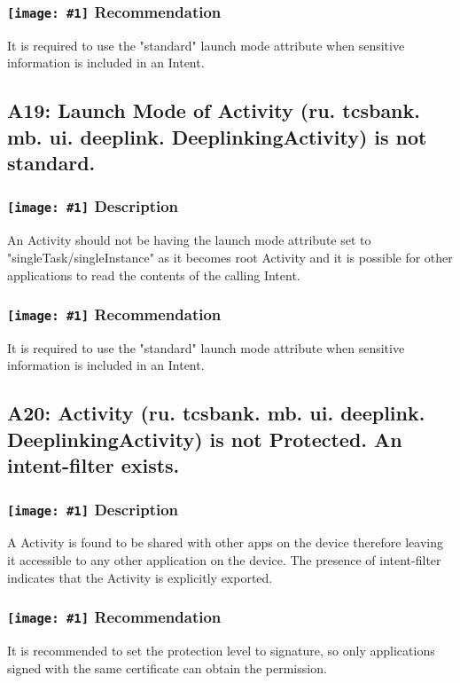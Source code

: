 \documentclass[12p]{article}
\newcommand{\icon}[1]{\texttt{[image: \#1]}}
\begin{document}
\subsubsection*{\protect\icon{/home/miki/Documents/GITHUB/AndroidPermissions/python/vulns/report_icons/basic_todo.png} Recommendation}
It is required to use the "standard" launch mode attribute when sensitive information is included in an Intent.
\subsection{A19: Launch Mode of Activity (ru. tcsbank. mb. ui. deeplink. DeeplinkingActivity) is not standard.}
\subsubsection*{\protect\icon{/home/miki/Documents/GITHUB/AndroidPermissions/python/vulns/report_icons/basic_sheet.png} Description}
An Activity should not be having the launch mode attribute set to "singleTask/singleInstance" as it becomes root Activity and it is possible for other applications to read the contents of the calling Intent.
\subsubsection*{\protect\icon{/home/miki/Documents/GITHUB/AndroidPermissions/python/vulns/report_icons/basic_todo.png} Recommendation}
It is required to use the "standard" launch mode attribute when sensitive information is included in an Intent.
\subsection{A20: Activity (ru. tcsbank. mb. ui. deeplink. DeeplinkingActivity) is not Protected. An intent-filter exists.}
\subsubsection*{\protect\icon{/home/miki/Documents/GITHUB/AndroidPermissions/python/vulns/report_icons/basic_sheet.png} Description}
A  Activity is found to be shared with other apps on the device therefore leaving it accessible to any other application on the device. The presence of intent-filter indicates that the Activity is explicitly exported.
\subsubsection*{\protect\icon{/home/miki/Documents/GITHUB/AndroidPermissions/python/vulns/report_icons/basic_todo.png} Recommendation}
It is recommended to set the protection level to signature, so only applications signed with the same certificate can obtain the permission.
\end{document}
